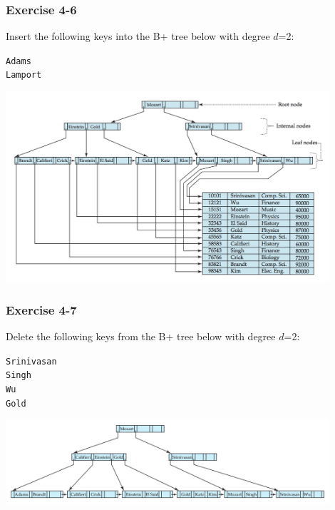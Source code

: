 \begin{frame}
\frametitle{Exercise 4-6}

Insert the following keys into the B+ tree below with degree $d$=2:

\texttt{Adams}\\
\texttt{Lamport}

\begin{center}
  \includegraphics[width=0.9\textwidth]{images/b-tree-complete.png}
\end{center}

\end{frame}


\begin{frame}
\frametitle{Exercise 4-7}

Delete the following keys from the B+ tree below with degree $d$=2:

\texttt{Srinivasan}\\
\texttt{Singh}\\
\texttt{Wu}\\
\texttt{Gold}

\begin{center}
  \includegraphics[width=0.9\textwidth]{images/b-tree-insert_adams.png}
\end{center}

\end{frame}



